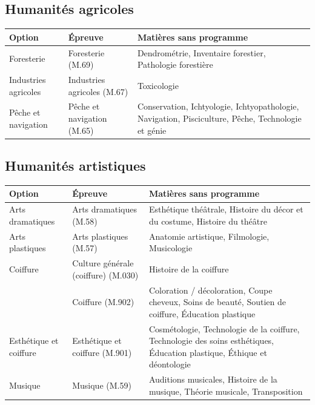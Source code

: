 \documentclass[11pt,a4paper]{article}
\begin{document}
\subsection{Humanités agricoles}
\begin{longtable}{@{}>{\raggedright\arraybackslash}p{3.4cm}>{\raggedright\arraybackslash}p{4.4cm}>{\raggedright\arraybackslash}p{7.4cm}@{}}
\toprule
\textbf{Option} & \textbf{Épreuve} & \textbf{Matières sans programme}\\
\midrule\endhead
Foresterie & Foresterie (M.69) & Dendrométrie, Inventaire forestier, Pathologie forestière\\
Industries agricoles & Industries agricoles (M.67) & Toxicologie\\
Pêche et navigation & Pêche et navigation (M.65) & Conservation, Ichtyologie, Ichtyopathologie, Navigation, Pisciculture, Pêche, Technologie et génie\\
\bottomrule
\end{longtable}

\subsection{Humanités artistiques}
\begin{longtable}{@{}>{\raggedright\arraybackslash}p{3.4cm}>{\raggedright\arraybackslash}p{4.4cm}>{\raggedright\arraybackslash}p{7.4cm}@{}}
\toprule
\textbf{Option} & \textbf{Épreuve} & \textbf{Matières sans programme}\\
\midrule\endhead
Arts dramatiques & Arts dramatiques (M.58) & Esthétique théâtrale, Histoire du décor et du costume, Histoire du théâtre\\
Arts plastiques & Arts plastiques (M.57) & Anatomie artistique, Filmologie, Musicologie\\
Coiffure & Culture générale (coiffure) (M.030) & Histoire de la coiffure\\
 & Coiffure (M.902) & Coloration / décoloration, Coupe cheveux, Soins de beauté, Soutien de coiffure, Éducation plastique\\
Esthétique et coiffure & Esthétique et coiffure (M.901) & Cosmétologie, Technologie de la coiffure, Technologie des soins esthétiques, Éducation plastique, Éthique et déontologie\\
Musique & Musique (M.59) & Auditions musicales, Histoire de la musique, Théorie musicale, Transposition\\
\bottomrule
\end{longtable}
\end{document}
